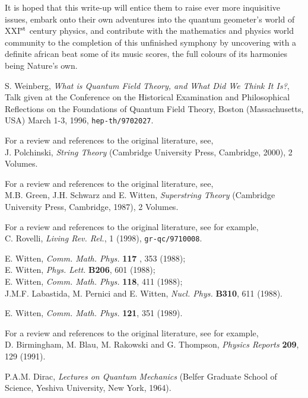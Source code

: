 \documentclass[a4paper,11pt]{article}
\begin{document}
It is hoped that this write-up will entice them to raise ever 
more in\-qui\-si\-ti\-ve issues, embark onto their own adventures into the 
quantum geometer's world of XXI$^{\rm st}$ century physics, and 
contribute with the mathematics and physics world community to the
completion of this unfinished symphony by uncovering with a definite african
beat some of its music scores, the full colours of its harmonies 
being Nature's own.

\clearpage

\begin{thebibliography}{99}

 S. Weinberg, {\sl What is Quantum Field Theory, and What
Did We Think It Is?\/}, Talk given at the Conference on the Historical 
Examination and Philosophical Reflections on the Foundations of Quantum 
Field Theory, Boston (Massachusetts, USA)  March 1-3, 1996, 
{\tt hep-th/9702027}.

 For a review and references to the original literature, see,\\
J. Polchinski, {\sl String Theory\/} (Cambridge University Press,
Cambridge, 2000), 2 Volumes.

 For a review and references to the original literature, see,\\
M.B. Green, J.H. Schwarz and E. Witten, {\sl Superstring Theory\/}
(Cambridge University Press, Cambridge, 1987), 2 Volumes.

 For a review and references to the original literature, see for
example,\\
C. Rovelli, {\em Living Rev. Rel.\/}, 1 (1998), {\tt gr-qc/9710008}.

 E. Witten, {\em Comm. Math. Phys.\/} {\bf 117} , 353 (1988);\\
E. Witten, {\em Phys. Lett.\/} {\bf B206}, 601 (1988);\\
E. Witten, {\em Comm. Math. Phys.\/} {\bf 118}, 411 (1988);\\
J.M.F. Labastida, M. Pernici and E. Witten, {\em Nucl. Phys.\/} {\bf B310}, 
611 (1988).

 E. Witten, {\em Comm. Math. Phys.\/} {\bf 121}, 351 (1989).

 For a review and references to the original literature, see
for example,\\
D. Birmingham, M. Blau, M. Rakowski and G. Thompson, {\em Physics Reports\/}
{\bf 209}, 129 (1991).

 P.A.M. Dirac, {\sl Lectures on Quantum Mechanics\/} (Belfer
Graduate School of Science, Yeshiva University, New York, 1964).


\end{thebibliography}
\end{document}
